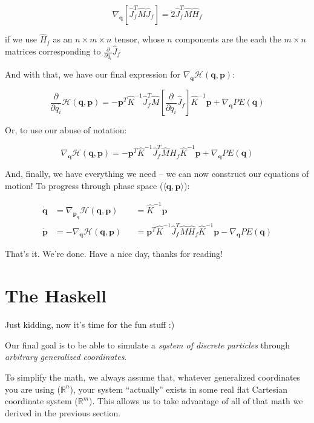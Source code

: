 \documentclass[]{article}
\begin{document}
\[
\nabla_{\mathbf{q}} \left[ \hat{J}_f^T \hat{M} \hat{J}_f \right] =
    2 \hat{J}_f^T \hat{M} \hat{H}_f
\]

if we use \(\hat{H}_f\) as an \(n \times m \times n\) tensor, whose \(n\)
components are the each the \(m \times n\) matrices corresponding to
\(\frac{\partial}{\partial q_i} \hat{J}_f\)

And with that, we have our final expression for
\(\nabla_{\mathbf{q}} \mathcal{H}(\mathbf{q},\mathbf{p})\):

\[
\frac{\partial}{\partial q_i} \mathcal{H}(\mathbf{q},\mathbf{p}) =
    - \mathbf{p}^T \hat{K}^{-1} \hat{J}_f^T \hat{M}
        \left[ \frac{\partial}{\partial q_i} \hat{J}_f \right] \hat{K}^{-1} \mathbf{p}
    + \nabla_{\mathbf{q}} PE(\mathbf{q})
\]

Or, to use our abuse of notation:

\[
\nabla_{\mathbf{q}} \mathcal{H}(\mathbf{q},\mathbf{p}) =
    - \mathbf{p}^T \hat{K}^{-1} \hat{J}_f^T \hat{M}
        \hat{H}_f \hat{K}^{-1} \mathbf{p}
    + \nabla_{\mathbf{q}} PE(\mathbf{q})
\]

And, finally, we have everything we need -- we can now construct our equations
of motion! To progress through phase space (\(\langle \mathbf{q},
\mathbf{p}\rangle\)):

\[
\begin{aligned}
\dot{\mathbf{q}} & = \nabla_{\mathbf{p_q}} \mathcal{H}(\mathbf{q},\mathbf{p})
  && = \hat{K}^{-1} \mathbf{p} \\
\dot{\mathbf{p}} & = - \nabla_{\mathbf{q}} \mathcal{H}(\mathbf{q},\mathbf{p})
  && = \mathbf{p}^T \hat{K}^{-1} \hat{J}_f^T \hat{M}
        \hat{H}_f \hat{K}^{-1} \mathbf{p}
    - \nabla_{\mathbf{q}} PE(\mathbf{q})
\end{aligned}
\]

That's it. We're done. Have a nice day, thanks for reading!

\section{The Haskell}\label{the-haskell}

Just kidding, now it's time for the fun stuff :)

Our final goal is to be able to simulate a \emph{system of discrete particles}
through \emph{arbitrary generalized coordinates}.

To simplify the math, we always assume that, whatever generalized coordinates
you are using (\(\mathbb{R}^n\)), your system ``actually'' exists in some real
flat Cartesian coordinate system (\(\mathbb{R}^m\)). This allows us to take
advantage of all of that math we derived in the previous section.
\end{document}
